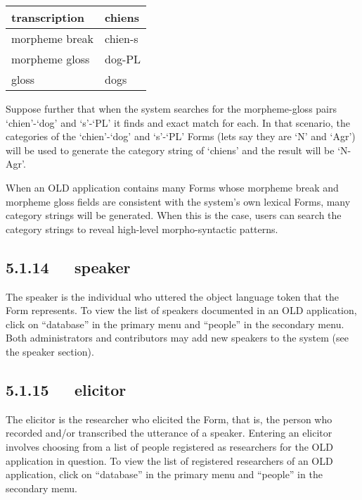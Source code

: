 \documentclass[letterpaper,10pt,english]{sphinxmanual}
\begin{document}
\begin{tabulary}{\linewidth}{|L|L|}
\hline

transcription
 & 
chiens
\\\hline

morpheme break
 & 
chien-s
\\\hline

morpheme gloss
 & 
dog-PL
\\\hline

gloss
 & 
dogs
\\\hline
\end{tabulary}


Suppose further that when the system searches for the morpheme-gloss pairs
`chien'-`dog' and `s'-`PL' it finds and exact match for each.  In that scenario,
the categories of the `chien'-`dog' and `s'-`PL' Forms (lets say they are `N'
and `Agr') will be used to generate the category string of `chiens' and the
result will be `N-Agr'.

When an OLD application contains many Forms whose morpheme break and morpheme
gloss fields are consistent with the system's own lexical Forms, many category
strings will be generated.  When this is the case, users can search the category
strings to reveal high-level morpho-syntactic patterns.


\subsection{5.1.14   speaker}
\label{documentation:speaker}
The speaker is the individual who uttered the object language token that the
Form represents.  To view the list of speakers documented in an OLD application,
click on ``database'' in the primary menu and ``people'' in the secondary menu.
Both administrators and contributors may add new speakers to the system (see the
speaker section).


\subsection{5.1.15   elicitor}
\label{documentation:elicitor}
The elicitor is the researcher who elicited the Form, that is, the person who
recorded and/or transcribed the utterance of a speaker.  Entering an elicitor
involves choosing from a list of people registered as researchers for the OLD
application in question.  To view the list of registered researchers of an OLD
application, click on ``database'' in the primary menu and ``people'' in the
secondary menu.
\end{document}
